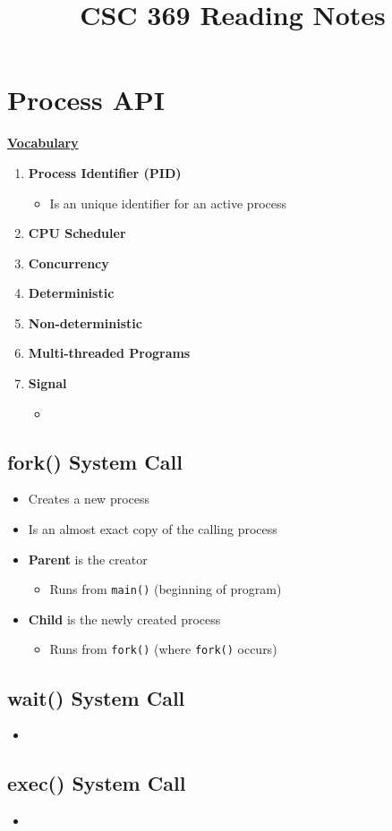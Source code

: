 \documentclass[12pt]{article}
\begin{document}
\title{CSC 369 Reading Notes}

\section{Process API}

\begin{mdframed}
\underline{\textbf{Vocabulary}}

\bigskip

\begin{enumerate}[1.]
    \item \textbf{Process Identifier (PID)}
    \begin{itemize}
        \item Is an unique identifier for an active process
    \end{itemize}
    \item \textbf{CPU Scheduler}
    \item \textbf{Concurrency}
    \item \textbf{Deterministic}
    \item \textbf{Non-deterministic}
    \item \textbf{Multi-threaded Programs}
    \item \textbf{Signal}
    \begin{itemize}
        \item
    \end{itemize}
\end{enumerate}

\end{mdframed}

\subsection{fork() System Call}
\begin{itemize}
    \item Creates a new process
    \item Is an almost exact copy of the calling process
    \item \textbf{Parent} is the creator
    \begin{itemize}
        \item Runs from \texttt{main()} (beginning of program)
    \end{itemize}
    \item \textbf{Child} is the newly created process
    \begin{itemize}
        \item Runs from \texttt{fork()} (where \texttt{fork()} occurs)
    \end{itemize}
\end{itemize}

\subsection{wait() System Call}
\begin{itemize}
    \item
\end{itemize}

\subsection{exec() System Call}
\begin{itemize}
    \item
\end{itemize}
\end{document}
